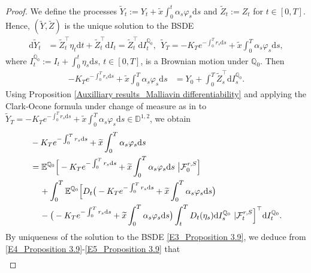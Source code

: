 \documentclass[12,reqno]{amsart}
\numberwithin{equation}{section}
\begin{document}
\begin{proof}
	We define the processes $\tilde{Y}_{t}:=Y_{t}+\widetilde{x}\int_{0}^{t}\alpha_{s}\varphi_{s}\mathrm{d}s$ and $\tilde{Z}_{t}:=Z_{t}$ for $t\in[0,T]$. Hence, $(\tilde{Y},\tilde{Z})$ is the unique solution to the BSDE
	\begin{align}\label{E3_Proposition 3.9}
		\mathrm{d}\tilde{Y}_{t}&=\tilde{Z}_{t}^{\top}\eta_{t}\mathrm{d}t+\tilde{Z}_{t}^{\top}\mathrm{d}I_{t}=\tilde{Z}_{t}^{\top}\mathrm{d}I_{t}^{\mathbb{Q}_{0}},~~\tilde{Y}_{T}=-K_{T}e^{-\int_{0}^{T}r_{s}\mathrm{d}s}+\widetilde{x}\int_{0}^{T}\alpha_{s}\varphi_{s}\mathrm{d}s,
	\end{align}
	where $I_{t}^{\mathbb{Q}_{0}}:=I_{t}+\int_{0}^{t}\eta_{s}\mathrm{d}s,\,t\in[0,T]$, is a Brownian motion under $\mathbb{Q}_{0}$. Then
	\begin{align}\label{E4_Proposition 3.9}
		-K_{T}e^{-\int_{0}^{T}r_{s}\mathrm{d}s}+\widetilde{x}\int_{0}^{T}\alpha_{s}\varphi_{s}\mathrm{d}s&=Y_{0}+\int_{0}^{T}\tilde{Z}_{s}^{\top}\mathrm{d}I_{s}^{\mathbb{Q}_{0}}.
	\end{align}
	Using Proposition \ref{Auxilliary results_Malliavin differentiability} and applying the Clark-Ocone formula under change of measure as in \cite[Thm.~4.5]{nunno2008malliavin} to $\tilde{Y}_{T}=-K_{T}e^{-\int_{0}^{T}r_{s}\mathrm{d}s}+\widetilde{x}\int_{0}^{T}\alpha_{s}\varphi_{s}\mathrm{d}s\in\mathbb{D}^{1,2}$, we obtain
	\begin{align}\label{E5_Proposition 3.9}
		&-K_{T}e^{-\int_{0}^{T}r_{s}\mathrm{d}s}+\widetilde{x}\int_{0}^{T}\alpha_{s}\varphi_{s}\mathrm{d}s\notag\\
		&=\mathbb{E}^{\mathbb{Q}_{0}}\Big[-K_{T}e^{-\int_{0}^{T}r_{s}\mathrm{d}s}+\widetilde{x}\int_{0}^{T}\alpha_{s}\varphi_{s}\mathrm{d}s~\big|\mathcal{F}_{0}^{r,S}\Big]\notag\\
		&\phantom{xx}+\int_{0}^{T}\mathbb{E}^{\mathbb{Q}_{0}}\Big[D_{t}\big(-K_{T}e^{-\int_{0}^{T}r_{s}\mathrm{d}s}+\widetilde{x}\int_{0}^{T}\alpha_{s}\varphi_{s}\mathrm{d}s\big)\notag\\
		&\phantom{xx}-\big(-K_{T}e^{-\int_{0}^{T}r_{s}\mathrm{d}s}+\widetilde{x}\int_{0}^{T}\alpha_{s}\varphi_{s}\mathrm{d}s\big)\int_{t}^{T}D_{t}(\eta_{s})\mathrm{d}I_{s}^{\mathbb{Q}_{0}}~|\mathcal{F}_{t}^{r,S}\Big]^{\top}\mathrm{d}I_{t}^{\mathbb{Q}_{0}}.
	\end{align}
	By uniqueness of the solution to the BSDE \eqref{E3_Proposition 3.9}, we deduce from \eqref{E4_Proposition 3.9}-\eqref{E5_Proposition 3.9} that
	\begin{align}\label{E6_Proposition 3.9}

\end{align}
\end{proof}
\end{document}
